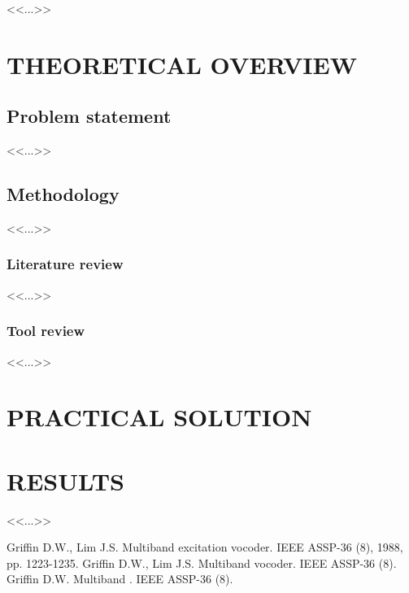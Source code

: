 \documentclass[a4paper,12pt]{extarticle}
\begin{document}
    
    \pagebreak

    
    \pagebreak

    \tableofcontents{}
    \pagebreak

    <<...>>

    \newpage
    \section{THEORETICAL OVERVIEW}
    \subsection{Problem statement}
    <<...>>

    \subsection{Methodology}
    <<...>>

    \subsubsection{Literature review}
    <<...>>

    \subsubsection{Tool review}
    <<...>>

    \newpage
    \section{PRACTICAL SOLUTION}
    

    \newpage
    \section{RESULTS}
    

    \newpage
    <<...>>

    \begin{thebibliography}{1}
         Griffin D.W., Lim J.S. \flqq Multiband excitation vocoder\frqq. IEEE ASSP-36 (8), 1988, pp. 1223-1235.
         Griffin D.W., Lim J.S. \flqq Multiband  vocoder\frqq. IEEE ASSP-36 (8).
         Griffin D.W. \flqq Multiband \frqq. IEEE ASSP-36 (8).
    \end{thebibliography}
\end{document}
